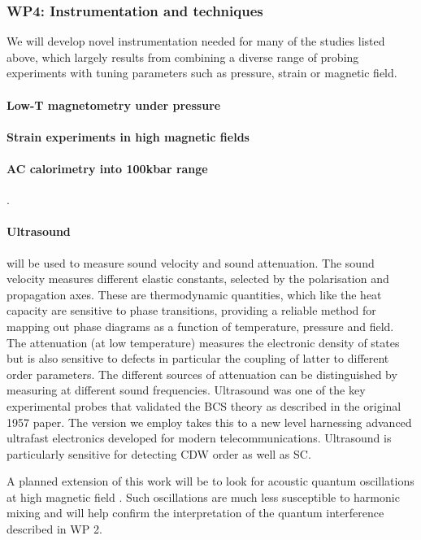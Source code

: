 \subsubsection*{WP4: Instrumentation and techniques}
\noindent We will develop novel instrumentation needed for many of the studies listed above, which largely results from combining a diverse range of probing experiments with tuning parameters such as pressure, strain or magnetic field.
\paragraph{Low-T magnetometry under pressure} 
\paragraph{Strain experiments in high magnetic fields} 
\paragraph{AC calorimetry into 100kbar range}  \cite{squire23}.
\paragraph{Ultrasound} will be used to measure sound velocity and sound attenuation. The sound velocity measures different elastic constants, selected by the polarisation and propagation axes. These are thermodynamic quantities, which like the heat capacity are sensitive to phase transitions, providing a reliable method for mapping out phase diagrams as a function of temperature, pressure and field. The attenuation (at low temperature) measures the electronic density of states but is also sensitive to defects in particular the coupling of latter to different order parameters. The different sources of attenuation can be distinguished by measuring at different sound frequencies. Ultrasound was one of the key experimental probes that validated the BCS theory as described in the original 1957 paper. The version we employ takes this to a new level harnessing advanced ultrafast electronics developed for modern telecommunications. %
Ultrasound is particularly sensitive for detecting CDW order as well as SC.

A planned extension of this work will be to look for acoustic quantum oscillations at high magnetic field \cite{shoenberg84,yoshizawa00,suslov06}.  %
Such oscillations are much less susceptible to harmonic mixing and will help confirm the interpretation of the quantum interference described in WP 2.

